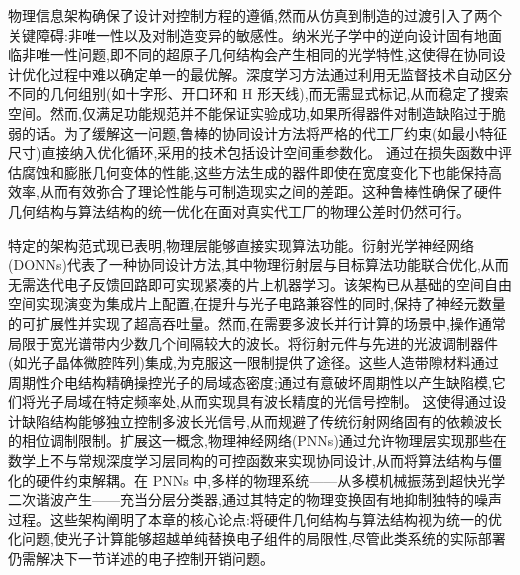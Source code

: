 \documentclass[11pt]{article}
\begin{document}
物理信息架构确保了设计对控制方程的遵循,然而从仿真到制造的过渡引入了两个关键障碍:非唯一性以及对制造变异的敏感性。纳米光子学中的逆向设计固有地面临非唯一性问题,即不同的超原子几何结构会产生相同的光学特性,这使得在协同设计优化过程中难以确定单一的最优解。深度学习方法通过利用无监督技术自动区分不同的几何组别(如十字形、开口环和 H 形天线),而无需显式标记,从而稳定了搜索空间。然而,仅满足功能规范并不能保证实验成功,如果所得器件对制造缺陷过于脆弱的话。为了缓解这一问题,鲁棒的协同设计方法将严格的代工厂约束(如最小特征尺寸)直接纳入优化循环,采用的技术包括设计空间重参数化。\citep{doi_10_1021_acsphotonics_2c00313_0d7d39c3} 通过在损失函数中评估腐蚀和膨胀几何变体的性能,这些方法生成的器件即使在宽度变化下也能保持高效率,从而有效弥合了理论性能与可制造现实之间的差距。这种鲁棒性确保了硬件几何结构与算法结构的统一优化在面对真实代工厂的物理公差时仍然可行。\citep{doi_10_1515_nanoph_2019_0474_d2187501} \citep{doi_10_1021_acsphotonics_0c01202_d9ad1299} \citep{doi_10_1021_acsphotonics_2c00313_0d7d39c3}

特定的架构范式现已表明,物理层能够直接实现算法功能。衍射光学神经网络(DONNs)代表了一种协同设计方法,其中物理衍射层与目标算法功能联合优化,从而无需迭代电子反馈回路即可实现紧凑的片上机器学习。该架构已从基础的空间自由空间实现演变为集成片上配置,在提升与光子电路兼容性的同时,保持了神经元数量的可扩展性并实现了超高吞吐量。然而,在需要多波长并行计算的场景中,操作通常局限于宽光谱带内少数几个间隔较大的波长。将衍射元件与先进的光波调制器件(如光子晶体微腔阵列)集成,为克服这一限制提供了途径。这些人造带隙材料通过周期性介电结构精确操控光子的局域态密度;通过有意破坏周期性以产生缺陷模,它们将光子局域在特定频率处,从而实现具有波长精度的光信号控制。\citep{doi_10_1371_journal_pone_0341241_2b7bcccf} \citep{doi_10_1109_isset62871_2024_10779731_6ff2a9a8} 这使得通过设计缺陷结构能够独立控制多波长光信号,从而规避了传统衍射网络固有的依赖波长的相位调制限制。扩展这一概念,物理神经网络(PNNs)通过允许物理层实现那些在数学上不与常规深度学习层同构的可控函数来实现协同设计,从而将算法结构与僵化的硬件约束解耦。在 PNNs 中,多样的物理系统------从多模机械振荡到超快光学二次谐波产生------充当分层分类器,通过其特定的物理变换固有地抑制独特的噪声过程。这些架构阐明了本章的核心论点:将硬件几何结构与算法结构视为统一的优化问题,使光子计算能够超越单纯替换电子组件的局限性,尽管此类系统的实际部署仍需解决下一节详述的电子控制开销问题。\citep{doi_10_1002_nap2_70098_8d5f2f8a} \citep{doi_10_1038_s41586_021_04223_6_6158a5ea} \citep{doi_10_1515_nanoph_2025_0168_86a0f7aa}
\end{document}
